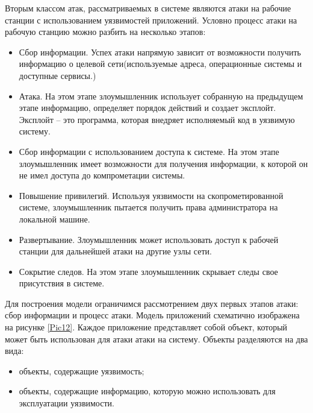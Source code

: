 \documentclass[12pt]{report}
\begin{document}
    Вторым классом атак, рассматриваемых в системе являются атаки на рабочие станции с использованием уязвимостей приложений. Условно процесс атаки на рабочую станцию можно разбить на несколько этапов:

    \begin{itemize}
        \item Сбор информации. Успех атаки напрямую зависит от возможности получить информацию о целевой сети(используемые адреса, операционные системы и доступные сервисы.)
        \item Атака. На этом этапе злоумышленник использует собранную на предыдущем этапе информацию, определяет порядок действий и создает эксплойт. Эксплойт -- это программа, которая внедряет исполняемый код в уязвимую систему.
        \item Сбор информации с использованием доступа к системе. На этом этапе злоумышленник имеет возможности для получения информации, к которой он не имел доступа до компрометации системы.
        \item Повышение привилегий. Используя уязвимости на скопрометированной системе, злоумышленник пытается получить права администратора на локальной машине.
        \item Развертывание. Злоумышленник может использовать доступ к рабочей станции для дальнейшей атаки на другие узлы сети.
        \item Сокрытие следов. На этом этапе злоумышленник скрывает следы свое присутствия в системе.
    \end{itemize}

    Для построения модели ограничимся рассмотрением двух первых этапов атаки: сбор информации и процесс атаки. Модель приложений схематично изображена на рисунке \ref{Pic12}. Каждое приложение представляет собой объект, который может быть использован для атаки атаки на систему. Объекты разделяются на два вида:

    \begin{itemize}
        \item объекты, содержащие уязвимость;
        \item объекты, содержащие информацию, которую можно использовать для эксплуатации уязвимости.
    \end{itemize}
\end{document}
